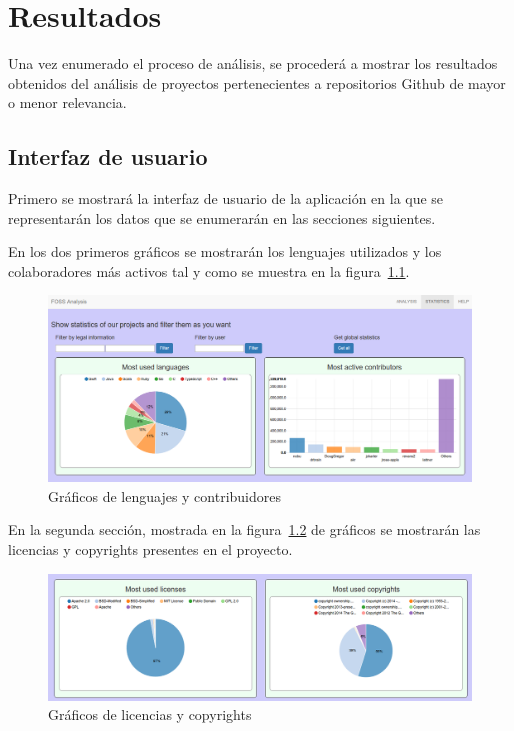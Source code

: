 \documentclass[a4paper, spanish, 12pt]{book}
\begin{document}
\cleardoublepage
\chapter{Resultados}

Una vez enumerado el proceso de an\'alisis, se proceder\'a a mostrar los resultados
obtenidos del an\'alisis de proyectos pertenecientes a repositorios Github de
mayor o menor relevancia.

\section{Interfaz de usuario}
\label{sec:user_interface}

Primero se mostrar\'a la interfaz de usuario de la aplicaci\'on en la que se representar\'an
los datos que se enumerar\'an en las secciones siguientes.

En los dos primeros gr\'aficos se mostrar\'an los lenguajes utilizados y los colaboradores
m\'as activos tal y como se muestra en la figura~\ref{fig:first_row}.

\begin{figure}
  \centering
  \includegraphics[width=12cm, keepaspectratio]{img/first_row}
  \caption{Gr\'aficos de lenguajes y contribuidores}
  \label{fig:first_row}
\end{figure}

En la segunda secci\'on, mostrada en la figura~\ref{fig:second_row} de gr\'aficos se mostrar\'an
las licencias y copyrights presentes en el proyecto.

\begin{figure}
  \centering
  \includegraphics[width=12cm, keepaspectratio]{img/second_row}
  \caption{Gr\'aficos de licencias y copyrights}
  \label{fig:second_row}
\end{figure}
\end{document}
